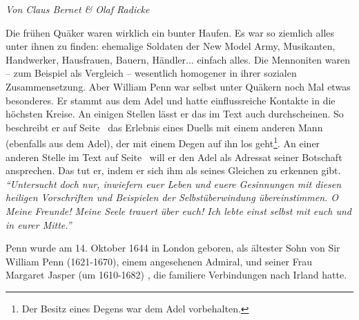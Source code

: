 %
%
%


\begin{flushright}
\begin{footnotesize}
\textit{Von Claus Bernet \& Olaf Radicke}
\end{footnotesize}
\end{flushright}
\smallskip

Die frühen Quäker waren wirklich ein bunter Haufen. Es war so ziemlich alles
unter ihnen zu finden: ehemalige Soldaten der New Model Army, Musikanten, Handwerker, Hausfrauen, Bauern, Händler... einfach alles.
Die Mennoniten waren --
zum Beispiel als Vergleich -- wesentlich homogener in ihrer sozialen Zusammensetzung.
Aber
William Penn war selbst unter Quäkern noch Mal etwas besonderes. Er stammt aus
dem Adel und hatte einflussreiche Kontakte in die höchsten Kreise. An einigen
Stellen lässt er das im Text auch durchscheinen. So beschreibt er auf
Seite~\pageref{kap9_ab2_duell_penn} das Erlebnis eines Duells
mit einem anderen Mann (ebenfalls aus dem Adel), der mit einem Degen auf ihn los
geht\footnote{Der Besitz eines
Degens war dem Adel vorbehalten.}. An einer anderen Stelle im Text auf
Seite~\pageref{15_04_penn_alte_freunde} will er den Adel als Adressat seiner
Botschaft ansprechen. Das tut er, indem er sich ihm als seines Gleichen zu erkennen
gibt.
\textit{"`Untersucht doch nur, inwiefern euer Leben und euere Gesinnungen mit
diesen heiligen Vorschriften und Beispielen der Selbstüberwindung
übereinstimmen. O Meine Freunde! Meine Seele trauert über euch! Ich lebte einst
selbst mit euch und in eurer Mitte."'}

\medskip

Penn wurde am 14. Oktober 1644 in London
 geboren, als ältester Sohn von Sir William Penn
(1621-1670), einem angesehenen Admiral, und
seiner Frau Margaret Jasper (um 1610-1682) ,
die familiere Verbindungen nach Irland  hatte.
\medskip

